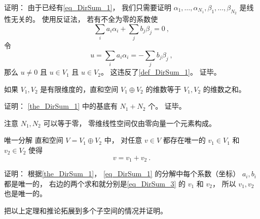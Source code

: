 证明： 由于已经有\autoref{eq_DirSum_1}， 我们只需要证明 $\alpha_1, \dots, \alpha_{N_1}, \beta_1, \dots, \beta_{N_2}$ 是线性无关的。 使用反证法， 若有不全为零的系数使
\begin{equation}
\sum_i a_i {\alpha_i} + \sum_j b_j {\beta_j} = 0~,
\end{equation}
令
\begin{equation}
u = \sum_i a_i {\alpha_i} = -\sum_j b_j {\beta_j}~,
\end{equation}
那么 $u \ne 0$ 且 $u \in V_1$ 且 $u \in V_2$。 这违反了\autoref{def_DirSum_1}。 证毕。

\begin{corollary}{}\label{cor_DirSum_1}
如果 $V_1, V_2$ 是有限维度的，直和空间 $V_1 \oplus V_2$ 的维数等于 $V_1, V_2$ 的维数之和。
\end{corollary}
证明： \autoref{the_DirSum_1} 中的基底有 $N_1 + N_2$ 个。 证毕。

注意 $N_1, N_2$ 可以等于零， 零维线性空间仅由零向量一个元素构成。

\begin{theorem}{唯一分解}
直和空间 $V = V_1 \oplus V_2$ 中， 对任意 $v \in V$ 都存在唯一的 $v_1 \in V_1$ 和 $v_2 \in V_2$ 使得
\begin{equation}\label{eq_DirSum_3}
v = v_1 + v_2~.
\end{equation}
\end{theorem}
证明： 根据\autoref{the_DirSum_1}， \autoref{eq_DirSum_1} 的分解中每个系数（坐标） $a_i, b_i$ 都是唯一的， 右边的两个求和就分别是\autoref{eq_DirSum_3} 的 $v_1$ 和 $v_2$， 所以 $v_1, v_2$ 也是唯一的。

\begin{exercise}{}
把以上定理和推论拓展到多个子空间的情况并证明。
\end{exercise}


